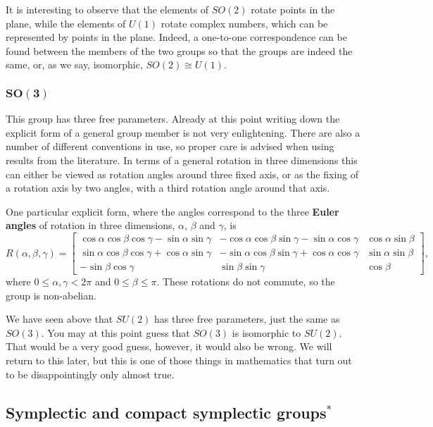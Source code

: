 \documentclass[notes.tex]{subfiles}
\begin{document}
It is interesting to observe that the elements of $SO(2)$ rotate points in the plane, while the elements of $U(1)$ rotate complex numbers, which can be represented by points in the plane. Indeed, a one-to-one correspondence can be found between the members of the two groups so that the groups are indeed the same, or, as we say, isomorphic, $SO(2)\cong U(1)$.

\subsubsection{$\mathbf{SO(3)}$}
This group has three free parameters. Already at this point writing down the explicit form of a general group member is not very enlightening. There are also a number of different conventions in use, so proper care is advised when using results from the literature. In terms of a general rotation in three dimensions this can either be viewed as rotation angles around three fixed axis, or as the fixing of a rotation axis by two angles, with a third rotation angle around that axis. 

One particular explicit form, where the angles correspond to the three {\bf Euler angles} of rotation in three dimensions, $\alpha$, $\beta$ and $\gamma$, is
\begin{equation}
R(\alpha,\beta,\gamma)=\left[\begin{matrix} 
\cos\alpha\cos\beta\cos\gamma-\sin\alpha\sin\gamma & -\cos\alpha\cos\beta\sin\gamma-\sin\alpha\cos\gamma & \cos\alpha\sin\beta  \\ 
\sin\alpha\cos\beta\cos\gamma+\cos\alpha\sin\gamma & -\sin\alpha\cos\beta\sin\gamma+\cos\alpha\cos\gamma & \sin\alpha\sin\beta  \\ 
-\sin\beta\cos\gamma & \sin\beta\sin\gamma  & \cos\beta 
\end{matrix}\right],
\label{eq:R3_rotation_Euler}
\end{equation}
where $0\le\alpha,\gamma< 2\pi$ and $0\le\beta\le\pi$. These rotations do not commute, so the group is non-abelian.

We have seen above that $SU(2)$ has three free parameters, just the same as $SO(3)$. You may at this point guess that $SO(3)$ is isomorphic to $SU(2)$. That would be a very good guess, however, it would also be wrong. We will return to this later, but this is one of those things in mathematics that turn out to be disappointingly only almost true.


\subsection{Symplectic and compact symplectic groups$^*$}
\end{document}
